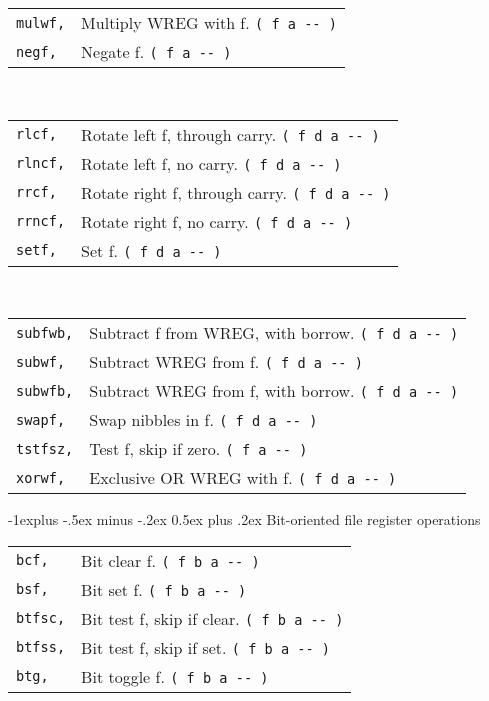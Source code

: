 \documentclass[10pt,landscape,a4paper]{article}
\makeatletter
\renewcommand{\subsection}{\@startsection{subsection}{2}{0mm}%
                                {-1explus -.5ex minus -.2ex}%
                                {0.5ex plus .2ex}%
                                {\normalfont\normalsize\bfseries}}
\makeatother
\begin{document}
\begin{multicols}{3}
\begin{tabular}{@{}ll@{}}
\verb!mulwf,!  & Multiply WREG with f. \verb!( f a -- )! \\
\verb!negf,!  & Negate f. \verb!( f a -- )! \\
\end{tabular} \\
\begin{tabular}{@{}ll@{}}
\verb!rlcf,!  & Rotate left f, through carry. \verb!( f d a -- )! \\
\verb!rlncf,!  & Rotate left f, no carry. \verb!( f d a -- )! \\
\verb!rrcf,!  & Rotate right f, through carry. \verb!( f d a -- )! \\
\verb!rrncf,!  & Rotate right f, no carry. \verb!( f d a -- )! \\
\verb!setf,!  & Set f. \verb!( f d a -- )! \\
\end{tabular} \\
\begin{tabular}{@{}ll@{}}
\verb!subfwb,!  & Subtract f from WREG, with borrow. \verb!( f d a -- )! \\
\verb!subwf,!  & Subtract WREG from f. \verb!( f d a -- )! \\
\verb!subwfb,!  & Subtract WREG from f, with borrow. \verb!( f d a -- )! \\
\verb!swapf,!  & Swap nibbles in f. \verb!( f d a -- )! \\
\verb!tstfsz,!  & Test f, skip if zero. \verb!( f a -- )! \\
\verb!xorwf,!  & Exclusive OR WREG with f. \verb!( f d a -- )! \\
\end{tabular}

\medskip

\subsection{Bit-oriented file register operations}
\begin{tabular}{@{}ll@{}}
\verb!bcf,! & Bit clear f. \verb!( f b a -- )! \\
\verb!bsf,! & Bit set f. \verb!( f b a -- )! \\
\verb!btfsc,! & Bit test f, skip if clear. \verb!( f b a -- )! \\
\verb!btfss,! & Bit test f, skip if set. \verb!( f b a -- )! \\
\verb!btg,!  & Bit toggle f. \verb!( f b a -- )! \\
\end{tabular}


\end{multicols}
\end{document}
